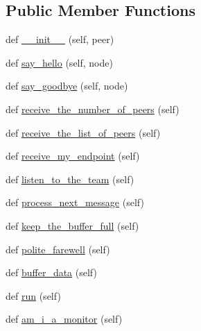 \subsection*{Public Member Functions}
\begin{DoxyCompactItemize}
\item 
def \hyperlink{classsrc_1_1core_1_1peer__dbs_1_1Peer__DBS_a41411fc6be8f7bfd13359ff180ff7d2f}{\+\_\+\+\_\+init\+\_\+\+\_\+} (self, peer)
\item 
def \hyperlink{classsrc_1_1core_1_1peer__dbs_1_1Peer__DBS_a2d708a217f203bda30921e5511ecb9a8}{say\+\_\+hello} (self, node)
\item 
def \hyperlink{classsrc_1_1core_1_1peer__dbs_1_1Peer__DBS_a489ca58c6aa79b47c6ebb9d2f3267348}{say\+\_\+goodbye} (self, node)
\item 
def \hyperlink{classsrc_1_1core_1_1peer__dbs_1_1Peer__DBS_a4fca27fc0794095d160ea3893876c1f8}{receive\+\_\+the\+\_\+number\+\_\+of\+\_\+peers} (self)
\item 
def \hyperlink{classsrc_1_1core_1_1peer__dbs_1_1Peer__DBS_ade29498101146c58d82e451267b24e32}{receive\+\_\+the\+\_\+list\+\_\+of\+\_\+peers} (self)
\item 
def \hyperlink{classsrc_1_1core_1_1peer__dbs_1_1Peer__DBS_aed0fd93df0126054ea2f26fe26a5aa46}{receive\+\_\+my\+\_\+endpoint} (self)
\item 
def \hyperlink{classsrc_1_1core_1_1peer__dbs_1_1Peer__DBS_a420335be06084664f7822735825d7f17}{listen\+\_\+to\+\_\+the\+\_\+team} (self)
\item 
def \hyperlink{classsrc_1_1core_1_1peer__dbs_1_1Peer__DBS_aae3e8cf37a751f2441440f139f1bdfa1}{process\+\_\+next\+\_\+message} (self)
\item 
def \hyperlink{classsrc_1_1core_1_1peer__dbs_1_1Peer__DBS_ad05c1cdcb376412d8aa46297d5c8943a}{keep\+\_\+the\+\_\+buffer\+\_\+full} (self)
\item 
def \hyperlink{classsrc_1_1core_1_1peer__dbs_1_1Peer__DBS_a8b111a1fafae5086bfdbc2cf9e7d0460}{polite\+\_\+farewell} (self)
\item 
def \hyperlink{classsrc_1_1core_1_1peer__dbs_1_1Peer__DBS_a732495ad69f86f0b105f115e73c688f7}{buffer\+\_\+data} (self)
\item 
def \hyperlink{classsrc_1_1core_1_1peer__dbs_1_1Peer__DBS_a11676ccd7989c8b282573fe0e4c8d3dc}{run} (self)
\item 
def \hyperlink{classsrc_1_1core_1_1peer__dbs_1_1Peer__DBS_ae9b897f5b62eab99fc3efe4f005fa5b5}{am\+\_\+i\+\_\+a\+\_\+monitor} (self)
\end{DoxyCompactItemize}
